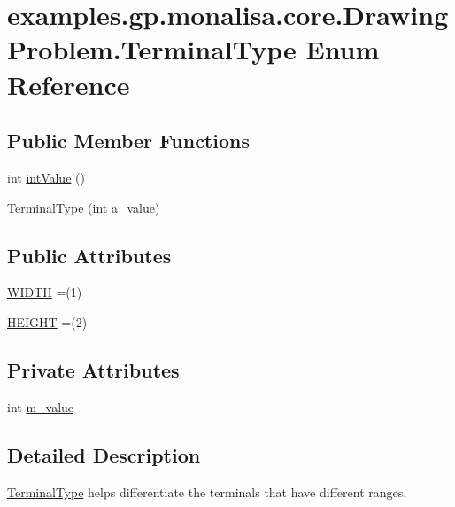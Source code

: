 \hypertarget{enumexamples_1_1gp_1_1monalisa_1_1core_1_1_drawing_problem_1_1_terminal_type}{\section{examples.\-gp.\-monalisa.\-core.\-Drawing\-Problem.\-Terminal\-Type Enum Reference}
\label{enumexamples_1_1gp_1_1monalisa_1_1core_1_1_drawing_problem_1_1_terminal_type}
}
\subsection*{Public Member Functions}
\begin{DoxyCompactItemize}
\item 
int \hyperlink{enumexamples_1_1gp_1_1monalisa_1_1core_1_1_drawing_problem_1_1_terminal_type_a8779a2583deb732b933b77dd4a17385b}{int\-Value} ()
\item 
\hyperlink{enumexamples_1_1gp_1_1monalisa_1_1core_1_1_drawing_problem_1_1_terminal_type_ac7bdd537e8ee9ac769db59ca3b23ec17}{Terminal\-Type} (int a\-\_\-value)
\end{DoxyCompactItemize}
\subsection*{Public Attributes}
\begin{DoxyCompactItemize}
\item 
\hyperlink{enumexamples_1_1gp_1_1monalisa_1_1core_1_1_drawing_problem_1_1_terminal_type_aee7ab8fc9eca04d5afdeb41f4196c0b3}{W\-I\-D\-T\-H} =(1)
\item 
\hyperlink{enumexamples_1_1gp_1_1monalisa_1_1core_1_1_drawing_problem_1_1_terminal_type_a72ed33e53f1ec9a913ba18cfc7e3e17f}{H\-E\-I\-G\-H\-T} =(2)
\end{DoxyCompactItemize}
\subsection*{Private Attributes}
\begin{DoxyCompactItemize}
\item 
int \hyperlink{enumexamples_1_1gp_1_1monalisa_1_1core_1_1_drawing_problem_1_1_terminal_type_a600abf62852998bcbb4bee93eee9f68e}{m\-\_\-value}
\end{DoxyCompactItemize}


\subsection{Detailed Description}
\hyperlink{enumexamples_1_1gp_1_1monalisa_1_1core_1_1_drawing_problem_1_1_terminal_type}{Terminal\-Type} helps differentiate the terminals that have different ranges. 

